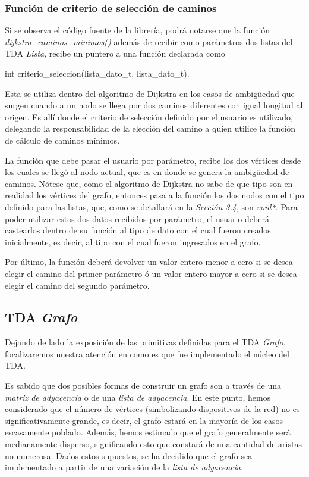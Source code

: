 \documentclass{article}
\begin{document}
\subsubsection{Función de criterio de selección de caminos}

	
	Si se observa el código fuente de la librería, podrá notarse que la función \textit{dijkstra\_caminos\_minimos()} además de recibir como parámetros dos listas del TDA \textit{Lista}, recibe un puntero a una función declarada como
\bigskip

{\ttfamily\footnotesize
\indent int criterio\_seleccion(lista\_dato\_t, lista\_dato\_t).\\}

	\par
	Esta se utiliza dentro del algoritmo de Dijkstra en los casos de ambigüedad que surgen cuando a un nodo se llega por dos caminos diferentes con igual longitud al origen. Es allí donde el criterio de selección definido por el usuario es utilizado, delegando la responsabilidad de la elección del camino a quien utilice la función de cálculo de caminos mínimos.
	\par
	La función que debe pasar el usuario por parámetro, recibe los dos vértices desde los cuales se llegó al nodo actual, que es en donde se genera la ambigüedad de caminos. Nótese que, como el algoritmo de Dijkstra no sabe de que tipo son en realidad los vértices del grafo, entonces pasa a la función los dos nodos con el tipo definido para las listas, que, como se detallará en la \textit{Sección 3.4}, son \textit{void*}. Para poder utilizar estos dos datos recibidos por parámetro, el usuario deberá castearlos dentro de su función al tipo de dato con el cual fueron creados inicialmente, es decir, al tipo con el cual fueron ingresados en el grafo.
	\par
	Por último, la función deberá devolver un valor entero menor a cero si se desea elegir el camino del primer parámetro ó un valor entero mayor a cero si se desea elegir el camino del segundo parámetro.
\bigskip



\subsection{TDA \textit{Grafo}}

	Dejando de lado la exposición de las primitivas definidas para el TDA \textit{Grafo}, focalizaremos nuestra atención en como es que fue implementado el núcleo del TDA.
	\par
	Es sabido que dos posibles formas de construir un grafo son a través de una \textit{matriz de adyacencia} o de una \textit{lista de adyacencia}. En este punto, hemos considerado que el número de vértices (simbolizando dispositivos de la red) no es significativamente grande, es decir, el grafo estará en la mayoría de los casos escasamente poblado. Además, hemos estimado que el grafo generalmente será medianamente disperso, significando esto que constará de una cantidad de aristas no numerosa. Dados estos supuestos, se ha decidido que el grafo sea implementado a partir de una variación de la \textit{lista de adyacencia}.
\bigskip
\end{document}
